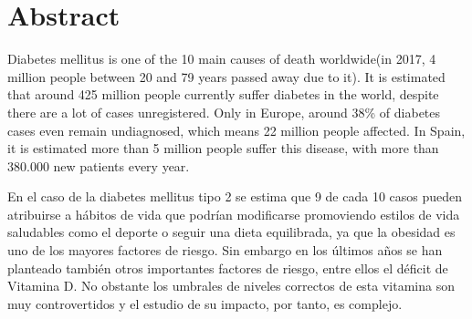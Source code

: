 \chapter*{Abstract}

 Diabetes mellitus is one of the 10 main causes of death worldwide(in 2017, 4 million people between 20 and 79 years passed away due to it). It is estimated that around 425 million people currently suffer diabetes in the world, despite there are a lot of cases unregistered. Only in Europe, around 38\% of diabetes cases  even remain undiagnosed, which means 22 million people affected. In Spain, it is estimated more than 5 million people suffer this disease, with more than 380.000 new patients every year.
 \newline
 
 	En el caso de la diabetes mellitus tipo 2 se estima que 9 de cada 10 casos pueden atribuirse a hábitos de vida que podrían modificarse promoviendo estilos de vida saludables como el deporte o seguir una dieta equilibrada, ya que la obesidad es uno de los mayores factores de riesgo. Sin embargo en los últimos años se han planteado también otros importantes factores de riesgo, entre ellos el déficit de Vitamina D. No obstante los umbrales de niveles correctos de esta vitamina son muy controvertidos y el estudio de su impacto, por tanto, es complejo. \newline
